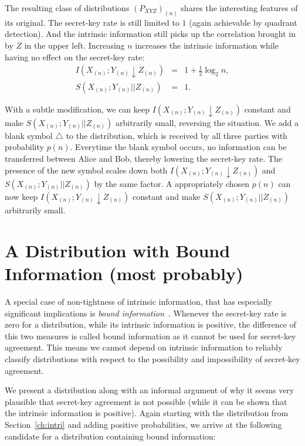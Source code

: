 \documentclass[a4paper, twoside, openany]{report}
\newcommand{\intrin}{I(X_{(n)};Y_{(n)}\!\!\downarrow\!Z_{(n)})}
\newcommand{\sraten}{S(X_{(n)};Y_{(n)}||Z_{(n)})}
\newcommand{\half}{\frac{1}{2}}
\newcommand{\blank}{\triangle}
\theoremstyle{plain}
\theoremstyle{definition}
\begin{document}
The resulting class of distributions $(P_{XYZ})_{(n)}$ shares the interesting features of its original. The secret-key rate is still limited to $1$ (again achievable by quadrant detection). And the intrinsic information still picks up the correlation brought in by $Z$ in the upper left. Increasing $n$ increases the intrinsic information while having no effect on the secret-key rate:
\begin{eqnarray*}
\intrin & = & 1 + \half\log_2 n, \\
\sraten & = & 1.
\end{eqnarray*}

With a subtle modification, we can keep $\intrin$ constant and make $\sraten$ arbitrarily small, reversing the situation. We add a blank symbol $\blank$ to the distribution, which is received by all three parties with probability $p(n)$. Everytime the blank symbol occurs, no information can be transferred between Alice and Bob, thereby lowering the secret-key rate. The presence of the new symbol scales down both $\intrin$ and $\sraten$ by the same factor. A appropriately chosen $p(n)$ can now keep $\intrin$ constant and make $\sraten$ arbitrarily small.


\section{A Distribution with Bound Information (most probably)} \label{bndinfoDistr}

A special case of non-tightness of intrinsic information, that has especially significant implications is \emph{bound information}~\cite{grw00}. Whenever the secret-key rate is zero for a distribution, while its intrinsic information is positive, the difference of this two measures is called bound information as it cannot be used for secret-key agreement. This means we cannot depend on intrinsic information to reliably classify distributions with respect to the possibility and impossibility of secret-key agreement.

We present a distribution along with an informal argument of why it seems very plausible that secret-key agreement is not possible (while it can be shown that the intrinsic information is positive). Again starting with the distribution from Section~\ref{ch:intri} and adding positive probabilities, we arrive at the following candidate for a distribution containing bound information:
\end{document}
